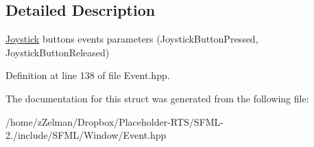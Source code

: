 \subsection{Detailed Description}
\hyperlink{classsf_1_1Joystick}{Joystick} buttons events parameters (Joystick\-Button\-Pressed, Joystick\-Button\-Released) 

Definition at line 138 of file Event.\-hpp.



The documentation for this struct was generated from the following file\-:\begin{DoxyCompactItemize}
\item 
/home/z\-Zelman/\-Dropbox/\-Placeholder-\/\-R\-T\-S/\-S\-F\-M\-L-\/2./include/\-S\-F\-M\-L/\-Window/Event.\-hpp\end{DoxyCompactItemize}
